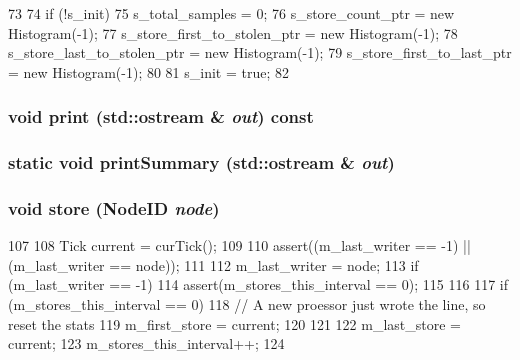 \begin{DoxyCode}
73 {
74     if (!s_init) {
75         s_total_samples = 0;
76         s_store_count_ptr = new Histogram(-1);
77         s_store_first_to_stolen_ptr = new Histogram(-1);
78         s_store_last_to_stolen_ptr = new Histogram(-1);
79         s_store_first_to_last_ptr = new Histogram(-1);
80     }
81     s_init = true;
82 }
\end{DoxyCode}
\hypertarget{classStoreTrace_ac55fe386a101fbae38c716067c9966a0}{
\subsubsection[{print}]{\setlength{\rightskip}{0pt plus 5cm}void print (std::ostream \& {\em out}) const}}
\label{classStoreTrace_ac55fe386a101fbae38c716067c9966a0}
\hypertarget{classStoreTrace_a740ccf8997d1ac557ed59a8ef3f1f97d}{
\subsubsection[{printSummary}]{\setlength{\rightskip}{0pt plus 5cm}static void printSummary (std::ostream \& {\em out})}}
\label{classStoreTrace_a740ccf8997d1ac557ed59a8ef3f1f97d}
\hypertarget{classStoreTrace_a285a721b0b9f1a9e1ddde05a41056279}{
\subsubsection[{store}]{\setlength{\rightskip}{0pt plus 5cm}void store ({\bf NodeID} {\em node})}}
\label{classStoreTrace_a285a721b0b9f1a9e1ddde05a41056279}



\begin{DoxyCode}
107 {
108     Tick current = curTick();
109 
110     assert((m_last_writer == -1) || (m_last_writer == node));
111 
112     m_last_writer = node;
113     if (m_last_writer == -1) {
114         assert(m_stores_this_interval == 0);
115     }
116 
117     if (m_stores_this_interval == 0) {
118         // A new proessor just wrote the line, so reset the stats
119         m_first_store = current;
120     }
121 
122     m_last_store = current;
123     m_stores_this_interval++;
124 }
\end{DoxyCode}


